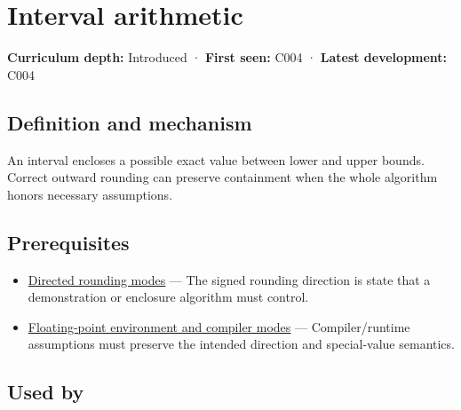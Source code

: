 \hypertarget{appendix-1823a14330cb}{}\label{referencestart:appendix-1823a14330cb}
\section{Interval arithmetic}\label{appendix-1823a14330cb-interval-arithmetic}

\hypertarget{appendix-1823a14330cb-interval-arithmetic}{}

\textbf{Curriculum depth:} Introduced · \textbf{First seen:} C004 · \textbf{Latest development:} C004

\begin{allmightroledefinition}

\subsection{Definition and mechanism}\label{appendix-1823a14330cb-definition-and-mechanism}

\hypertarget{appendix-1823a14330cb-definition-and-mechanism}{}

An interval encloses a possible exact value between lower and upper bounds. Correct outward rounding can preserve containment when the whole algorithm honors necessary assumptions.

\end{allmightroledefinition}

\subsection{Prerequisites}\label{appendix-1823a14330cb-prerequisites}

\hypertarget{appendix-1823a14330cb-prerequisites}{}

\begin{itemize}
\tightlist
\item
  \hyperref[appendix-637d164ae5ca]{Directed rounding modes} --- The signed rounding direction is state that a demonstration or enclosure algorithm must control.
\item
  \hyperref[appendix-f11d1a521253]{Floating-point environment and compiler modes} --- Compiler/runtime assumptions must preserve the intended direction and special-value semantics.
\end{itemize}

\subsection{Used by}\label{appendix-1823a14330cb-used-by}

